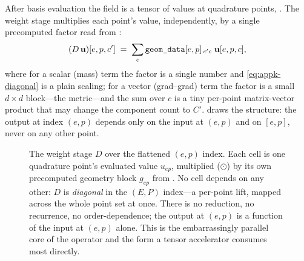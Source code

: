 After basis evaluation the field is a tensor of values at quadrature points,
\code{[(E, P, C)]}. The weight stage multiplies each point's value, independently,
by a single precomputed factor read from :
\begin{equation}
  (D\,\mathbf{u})[e,p,c'] \;=\; \sum_{c} \texttt{geom\_data}[e,p]\,{}_{c'c}\;\mathbf{u}[e,p,c],
  \label{eq:appk-diagonal}
\end{equation}
where for a scalar (mass) term the factor is a single number and \cref{eq:appk-diagonal}
is a plain scaling; for a vector (grad--grad) term the factor is a small $d\times d$
block---the metric---and the sum over $c$ is a tiny per-point matrix-vector product
that may change the component count to $C'$.  draws the
structure: the output at index $(e,p)$ depends only on the input at $(e,p)$ and on
$[e,p]$, never on any other point.

\begin{figure}[t]
\centering
{}
\caption[The weight stage as an embarrassingly parallel diagonal]{The weight stage
$D$ over the flattened $(e,p)$ index. Each cell is one quadrature point's evaluated
value $u_{ep}$, multiplied ($\odot$) by its own precomputed geometry block $g_{ep}$
from . No cell depends on any other: $D$ is \emph{diagonal} in the
$(E,P)$ index---a per-point lift, mapped across the whole point set at once. There
is no reduction, no recurrence, no order-dependence; the output at $(e,p)$ is a
function of the input at $(e,p)$ alone. This is the embarrassingly parallel core of
the operator and the form a tensor accelerator consumes most directly.}
\label{fig:appk-diagonal}
\end{figure}

